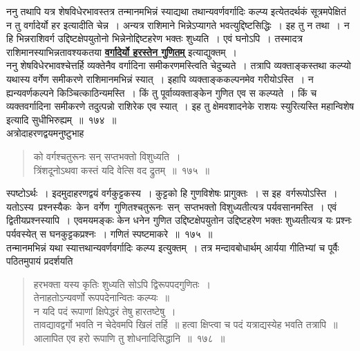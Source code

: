 \documentclass[11pt, openany]{book}
\begin{document}
\vspace{-4mm}
 ननु तथापि यत्र शेषविधेरभावस्तत्र तन्मानमभिन्नं स्याद्यथा तथान्यवर्णवर्गादिः
कल्प्य इत्येतदर्थकं सूत्रमपेक्षितं न तु वर्गादेर्यो हर इत्यादीति चेन्न~। अन्यत्र राशिमाने
\newpage
\noindent भिन्नेऽप्यागते भवत्युद्दिष्टसिद्धिः~। इह तु न तथा~। न हि भिन्नराशिवर्ग उद्दिष्टक्षेपयुतोनो भिन्नेनोद्दिष्टहरेण भक्तः शुध्यति~। एवं घनोऽपि~। तस्मादत्र
राशिमानस्याभिन्नतावश्यकतया \hyperref[174]{\textbf{वर्गादेर्यो हरस्तेन गुणितम्}} इत्याद्युक्तम्~।\\

\vspace{-4mm}
 ननु शेषविधेरभावश्चेत्तर्हि व्यक्तेनैव वर्गादिना समीकरणमस्त्विति
चेदुच्यते~। तत्रापि व्यक्ताङ्कस्तथा कल्प्यो यथास्य वर्गेण समीकरणे राशिमानमभिन्नं
स्यात्~। इहापि व्यक्ताङ्ककल्पनमेव गरीयोऽस्ति~। न ह्यन्यवर्णकल्पने
किञ्चित्काठिन्यमस्ति~।
किं तु पूर्वाव्यक्ताङ्केन गुणित एव स कल्प्यते~। किं च व्यक्तवर्गादिना समीकरणे तदुत्पन्नो राशिरेक एव स्यात्~। इह तु क्षेमवशादनेके राशयः स्युरित्यस्ति
महान्विशेष इत्यादि सुधीभिरुह्यम्~॥~१७४~॥\\

\vspace{-2mm}
 अत्रोदाहरणद्वयमनुष्टुभाह\textendash
\begin{quote}
    \eg 
      को वर्गश्चतुरूनः सन् सप्तभक्तो विशुध्यति~।\\
 त्रिंशदूनोऽथवा कस्तं यदि वेत्सि वद द्रुतम्~॥~१७५~॥

\end{quote}

 स्पष्टोऽर्थः~। इदमुदाहरणद्वयं वर्गकुट्टकस्य~। कुट्टको हि गुणविशेषः प्रागुक्तः~। स
इह \,वर्गरूपोऽस्ति~। यतोऽस्य \,प्रश्नस्यैकः \,केन \,वर्गेण \,गुणितश्चतुरूनः \,सन् \,सप्तभक्तो विशुध्यतीत्यत्र पर्यवसानमस्ति~। एवं द्वितीयप्रश्नस्यापि~। एवमयमङ्कः केन धनेन गुणित उद्दिष्टक्षेपयुतोन उद्दिष्टहरेण भक्तः शुध्यतीत्यत्र यः प्रश्नः
पर्यवस्येत् स घनकुट्टकप्रश्नः~। गणितं स्पष्टमाकरे~॥~१७५~॥\\

\vspace{-2mm}
 तन्मानमभिन्नं यथा स्यात्तथान्यवर्णवर्गादिः कल्प्य इत्युक्तम्~। तत्र
मन्दावबोधार्थम् आर्यया गीतिभ्यां च पूर्वैः पठितमुपायं प्रदर्शयति\textendash

 \label{178}
\begin{quote}
    \ab 
     हरभक्ता यस्य कृतिः शुध्यति सोऽपि द्विरूपपदगुणितः~।\\
 तेनाहतोऽन्यवर्णो रूपपदेनान्वितः कल्प्यः~॥\\
 न यदि पदं रूपाणां क्षिपेद्धरं तेषु हारतष्टेषु~।\\
 तावद्यावद्वर्गो भवति न चेदेवमपि खिलं तर्हि~॥
\newpage
  हत्वा क्षिप्त्वा च पदं यत्राद्यस्येह भवति तत्रापि~॥~\\
 आलापित एव हरो रूपाणि तु शोधनादिसिद्धानि~॥~१७८~॥
\end{quote}
  
\end{document}
